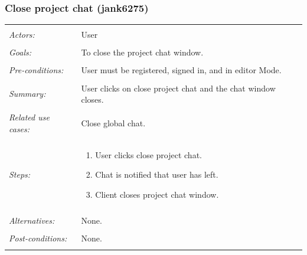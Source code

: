 \documentclass[11pt]{report}
\begin{document}
\subsubsection{Close project chat (jank6275)}
\begin{tabular}{ p{2cm} p{12cm} }
 \hline
 \\
 \textit{Actors:} & User \\ 
 \\
 \textit{Goals:} & To close the project chat window. \\
 \\
 \textit{Pre-conditions:} & User must be registered, signed in, and in editor Mode.  \\
 \\
 \textit{Summary:} & User clicks on close project chat and the chat window closes. \\ 
 \\
 \textit{Related use cases:} & Close global chat. \\ 
 \\
 \textit{Steps:} & \begin{enumerate}
  \item User clicks close project chat.
  \item Chat is notified that user has left.
  \item Client closes project chat window.
 \end{enumerate} \\
 \\
 \textit{Alternatives:} & None. \\
 \\
 \textit{Post-conditions:} & None. \\
 \\
\hline
\end{tabular}
\end{document}
